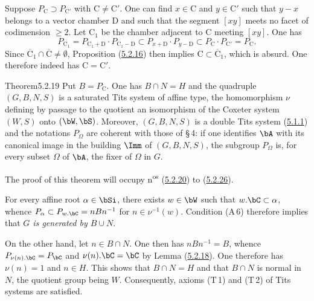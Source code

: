 \documentclass[12pt,a4paper,oneside,english]{smfart}
\makeatletter
\newcommand{\btanchor}[1]{\leavevmode\Hy@raisedlink{\hypertarget{bt:#1}{}}}
\newcommand{\btpageanchor}[1]{\Hy@raisedlink{\hypertarget{p:#1}{}}}
\newcommand{\btref}[1]{\hyperlink{bt:#1}{#1}}
\newcommand{\btpage}[1]{\marginnote{p.~#1}\btpageanchor{#1}}
\newcommand{\pg}[1]{\btpage{#1}}
\theoremstyle{definition}
\theoremstyle{bt}
\makeatother
\begin{document}
Suppose $P_{\mathrm{C}}\supset P_{\mathrm{C}'}$ with
$\mathrm{C}\neq \mathrm{C}'$. One can find $x\in \mathrm{C}$ and
$y\in \mathrm{C}'$ such that $y-x$ belongs to a vector chamber $\mathrm{D}$ and
such that the segment $[xy]$ meets no facet of codimension $\geqslant2$. Let
$\mathrm{C}_{1}$ be the chamber adjacent to $\mathrm{C}$ meeting $[xy]$. One has
\[
P_{\mathrm{C}_{1}}=P_{\mathrm{C}_{1}+\mathrm{D}}\cdot P_{\mathrm{C}_{1}-\mathrm{D}}
\subset P_{x+\mathrm{D}}\cdot P_{y-\mathrm{D}}
\subset P_{\mathrm{C}}\cdot P_{\mathrm{C}'}=P_{\mathrm{C}}.
\]
Since $\overline{\mathrm{C}}_{1}\cap\overline{\mathrm{C}}\neq\emptyset$,
Proposition (\btref{5.2.16}) then implies
$\mathrm{C}\subset\overline{\mathrm{C}}_{1}$, which is absurd. One therefore
indeed has $\mathrm{C}=\mathrm{C}'$.

\begin{btstat}{Theorem}{5.2.19}\btanchor{5.2.19}
Put $B=P_{\mathrm{C}}$. One has $B\cap N=H$ and the quadruple $(G,B,N,S)$ is a
saturated Tits system of affine type, the homomorphism $\nu$ defining by passage
to the quotient \pg{102}an isomorphism of the Coxeter system $(W,S)$ onto
$(\bW,\bS)$. Moreover, $(G,B,N,S)$ is a double Tits system \textup{(\btref{5.1.1})} and
the notations $P_{\Omega}$ are coherent with those of \S\,\textup{4}: if one
identifies $\bA$ with its canonical image in the building $\Imm$ of
$(G,B,N,S)$, the subgroup $P_{\Omega}$ is, for every subset $\Omega$ of $\bA$,
the fixer of $\Omega$ in $G$.
\end{btstat}

The proof of this theorem will occupy n\textsuperscript{os} (\btref{5.2.20}) to (\btref{5.2.26}).

\btanchor{5.2.20}
For every affine root $\alpha\in\bSi$, there exists $w\in\bW$ such that
$w.\bC\subset\alpha$, whence $P_{\alpha}\subset P_{w.\bC}=nBn^{-1}$ for
$n\in\nu^{-1}(w)$. Condition (A\,6) therefore implies that \emph{$G$ is
generated by $B\cup N$}.

On the other hand, let $n\in B\cap N$. One then has $nBn^{-1}=B$, whence
$P_{\nu(n).\bC}=P_{\bC}$ and $\nu(n).\bC=\bC$ by Lemma (\btref{5.2.18}). One therefore
has $\nu(n)=1$ and $n\in H$. This shows that $B\cap N=H$ and that $B\cap N$ is
normal in $N$, the quotient group being $W$. Consequently, axioms (T\,1) and
(T\,2) of Tits systems are satisfied.
\end{document}
